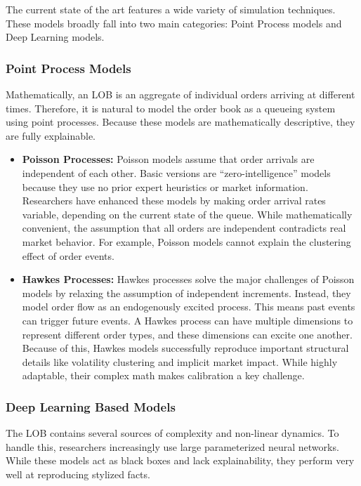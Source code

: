 The current state of the art features a wide variety of simulation techniques. These models broadly fall into two main categories: Point Process models and Deep Learning models. 

\subsubsection{Point Process Models}
Mathematically, an LOB is an aggregate of individual orders arriving at different times. Therefore, it is natural to model the order book as a queueing system using point processes. Because these models are mathematically descriptive, they are fully explainable.

\begin{itemize}
    \item \textbf{Poisson Processes:} Poisson models assume that order arrivals are independent of each other. Basic versions are ``zero-intelligence'' models because they use no prior expert heuristics or market information. Researchers have enhanced these models by making order arrival rates variable, depending on the current state of the queue. While mathematically convenient, the assumption that all orders are independent contradicts real market behavior. For example, Poisson models cannot explain the clustering effect of order events.
    \item \textbf{Hawkes Processes:} Hawkes processes solve the major challenges of Poisson models by relaxing the assumption of independent increments. Instead, they model order flow as an endogenously excited process. This means past events can trigger future events. A Hawkes process can have multiple dimensions to represent different order types, and these dimensions can excite one another. Because of this, Hawkes models successfully reproduce important structural details like volatility clustering and implicit market impact. While highly adaptable, their complex math makes calibration a key challenge.
\end{itemize}

\subsubsection{Deep Learning Based Models}
The LOB contains several sources of complexity and non-linear dynamics. To handle this, researchers increasingly use large parameterized neural networks. While these models act as black boxes and lack explainability, they perform very well at reproducing stylized facts.

